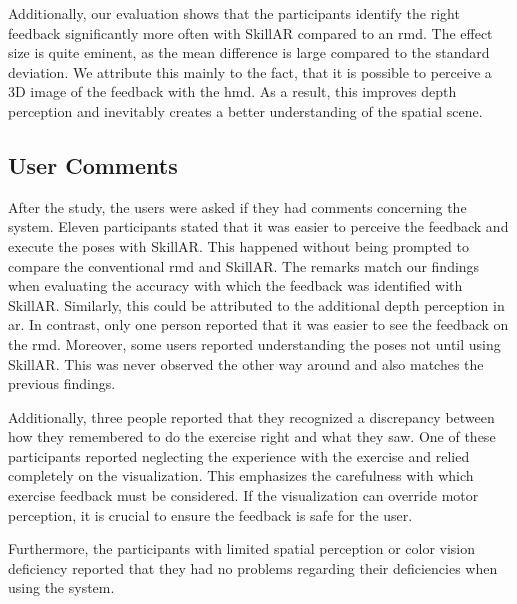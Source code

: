 Additionally, our evaluation shows that the participants identify the right feedback significantly more often with SkillAR compared to an \acrshort{rmd}. The effect size is quite eminent, as the mean difference is large compared to the standard deviation. We attribute this mainly to the fact, that it is possible to perceive a 3D image of the feedback with the \acrshort{hmd}. As a result, this improves depth perception and inevitably creates a better understanding of the spatial scene.

\subsection{User Comments \label{sec:comments}}
After the study, the users were asked if they had comments concerning the system. Eleven participants stated that it was easier to perceive the feedback and execute the poses with SkillAR. This happened without being prompted to compare the conventional \acrshort{rmd} and SkillAR. The remarks match our findings when evaluating the accuracy with which the feedback was identified with SkillAR. Similarly, this could be attributed to the additional depth perception in \acrshort{ar}. In contrast, only one person reported that it was easier to see the feedback on the \acrshort{rmd}. Moreover, some users reported understanding the poses not until using SkillAR. This was never observed the other way around and also matches the previous findings.

Additionally, three people reported that they recognized a discrepancy between how they remembered to do the exercise right and what they saw. One of these participants reported neglecting the experience with the exercise and relied completely on the visualization. This emphasizes the carefulness with which exercise feedback must be considered. If the visualization can override motor perception, it is crucial to ensure the feedback is safe for the user.

Furthermore, the participants with limited spatial perception or color vision deficiency reported that they had no problems regarding their deficiencies when using the system.

